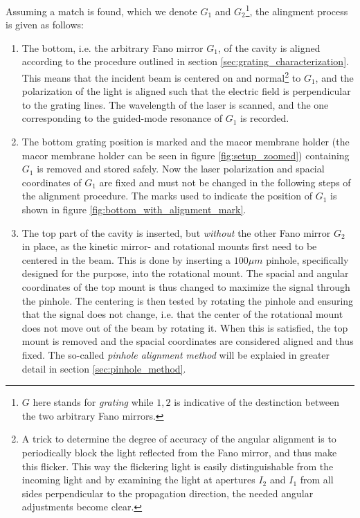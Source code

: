 Assuming a match is found, which we denote $G_1$ and $G_2$\footnote{$G$ here stands for \emph{grating} while $1,2$ is indicative of the destinction between the two arbitrary Fano mirrors.}, the alingment process is given as follows: 
\begin{enumerate}
    \item The bottom, i.e. the arbitrary Fano mirror $G_1$, of the cavity is aligned according to the procedure outlined in section \ref{sec:grating_characterization}. This means that the incident beam is centered on and normal\footnote{A trick to determine the degree of accuracy of the angular alignment is to periodically block the light reflected from the Fano mirror, and thus make this flicker. This way the flickering light is easily distinguishable from the incoming light and by examining the light at apertures $I_2$ and $I_1$ from all sides perpendicular to the propagation direction, the needed angular adjustments become clear.} to $G_1$, and the polarization of the light is aligned such that the electric field is perpendicular to the grating lines. The wavelength of the laser is scanned, and the one corresponding to the guided-mode resonance of $G_1$ is recorded.  
    \item The bottom grating position is marked and the macor membrane holder (the macor membrane holder can be seen in figure \ref{fig:setup_zoomed}) containing $G_1$ is removed and stored safely. Now the laser polarization and spacial coordinates of $G_1$ are fixed and must not be changed in the following steps of the alignment procedure. The marks used to indicate the position of $G_1$ is shown in figure \ref{fig:bottom_with_alignment_mark}.
    \item The top part of the cavity is inserted, but \emph{without} the other Fano mirror $G_2$ in place, as the kinetic mirror- and rotational mounts first need to be centered in the beam. This is done by inserting a $100 \mu m$ pinhole, specifically designed for the purpose, into the rotational mount. The spacial and angular coordinates of the top mount is thus changed to maximize the signal through the pinhole. The centering is then tested by rotating the pinhole and ensuring that the signal does not change, i.e. that the center of the rotational mount does not move out of the beam by rotating it. When this is satisfied, the top mount is removed and the spacial coordinates are considered aligned and thus fixed. The so-called \emph{pinhole alignment method} will be explaied in greater detail in section \ref{sec:pinhole_method}.

\end{enumerate}
